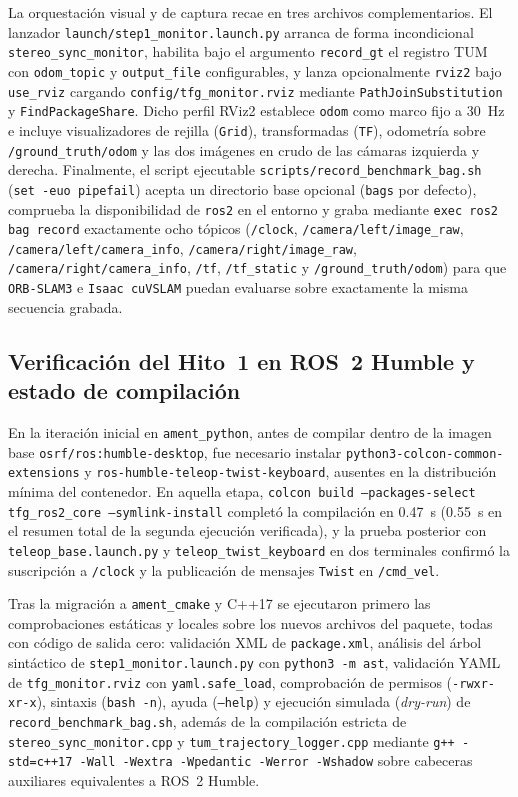 La orquestación visual y de captura recae en tres archivos complementarios. El lanzador \texttt{launch/step1\_monitor.launch.py} arranca de forma incondicional \texttt{stereo\_sync\_monitor}, habilita bajo el argumento \texttt{record\_gt} el registro TUM con \texttt{odom\_topic} y \texttt{output\_file} configurables, y lanza opcionalmente \texttt{rviz2} bajo \texttt{use\_rviz} cargando \texttt{config/tfg\_monitor.rviz} mediante \texttt{PathJoinSubstitution} y \texttt{FindPackageShare}. Dicho perfil RViz2 establece \texttt{odom} como marco fijo a \qty{30}{\hertz} e incluye visualizadores de rejilla (\texttt{Grid}), transformadas (\texttt{TF}), odometría sobre \texttt{/ground\_truth/odom} y las dos imágenes en crudo de las cámaras izquierda y derecha. Finalmente, el script ejecutable \texttt{scripts/record\_benchmark\_bag.sh} (\texttt{set -euo pipefail}) acepta un directorio base opcional (\texttt{bags} por defecto), comprueba la disponibilidad de \texttt{ros2} en el entorno y graba mediante \texttt{exec ros2 bag record} exactamente ocho tópicos (\texttt{/clock}, \texttt{/camera/left/image\_raw}, \texttt{/camera/left/camera\_info}, \texttt{/camera/right/image\_raw}, \texttt{/camera/right/camera\_info}, \texttt{/tf}, \texttt{/tf\_static} y \texttt{/ground\_truth/odom}) para que \texttt{ORB-SLAM3} e \texttt{Isaac cuVSLAM} puedan evaluarse sobre exactamente la misma secuencia grabada.

\subsection{Verificación del Hito~1 en ROS~2 Humble y estado de compilación}
\label{sec:verificacion_hito1}

En la iteración inicial en \texttt{ament\_python}, antes de compilar dentro de la imagen base \texttt{osrf/ros:humble-desktop}, fue necesario instalar \texttt{python3-colcon-common-extensions} y \texttt{ros-humble-teleop-twist-keyboard}, ausentes en la distribución mínima del contenedor. En aquella etapa, \texttt{colcon build --packages-select tfg\_ros2\_core --symlink-install} completó la compilación en \qty{0.47}{\second} (\qty{0.55}{\second} en el resumen total de la segunda ejecución verificada), y la prueba posterior con \texttt{teleop\_base.launch.py} y \texttt{teleop\_twist\_keyboard} en dos terminales confirmó la suscripción a \texttt{/clock} y la publicación de mensajes \texttt{Twist} en \texttt{/cmd\_vel}.

Tras la migración a \texttt{ament\_cmake} y C++17 se ejecutaron primero las comprobaciones estáticas y locales sobre los nuevos archivos del paquete, todas con código de salida cero: validación XML de \texttt{package.xml}, análisis del árbol sintáctico de \texttt{step1\_monitor.launch.py} con \texttt{python3 -m ast}, validación YAML de \texttt{tfg\_monitor.rviz} con \texttt{yaml.safe\_load}, comprobación de permisos (\texttt{-rwxr-xr-x}), sintaxis (\texttt{bash -n}), ayuda (\texttt{--help}) y ejecución simulada (\textit{dry-run}) de \texttt{record\_benchmark\_bag.sh}, además de la compilación estricta de \texttt{stereo\_sync\_monitor.cpp} y \texttt{tum\_trajectory\_logger.cpp} mediante \texttt{g++ -std=c++17 -Wall -Wextra -Wpedantic -Werror -Wshadow} sobre cabeceras auxiliares equivalentes a ROS~2 Humble.

